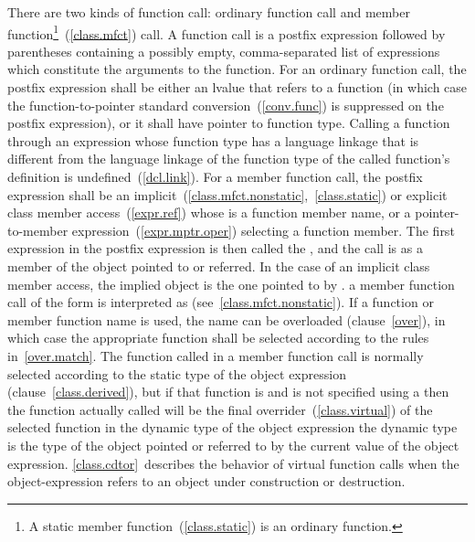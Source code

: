 \pnum
{}%
%
%
There are two kinds of function call: ordinary function call and member
function\footnote{A static member function~(\ref{class.static}) is an ordinary
function.}~(\ref{class.mfct}) call.
A function call is a postfix expression followed by parentheses
containing a possibly empty, comma-separated list of expressions which
constitute the arguments to the function. For an ordinary function call,
the postfix expression shall be either an lvalue that refers to a
function (in which case the function-to-pointer standard
conversion~(\ref{conv.func}) is suppressed on the postfix expression),
or it shall have pointer to function type. Calling a function through an
expression whose function type has a language linkage that is different
from the language linkage of the function type of the called function's
definition is undefined~(\ref{dcl.link}). For a member function call,
the postfix expression shall be an
implicit~(\ref{class.mfct.nonstatic},~\ref{class.static}) or explicit
class member access~(\ref{expr.ref}) whose  is a
function member name, or a pointer-to-member
expression~(\ref{expr.mptr.oper}) selecting a function member. The first
expression in the postfix expression is then called the
, and the call is as a member of
the object pointed to or referred. In the case of an implicit class
member access, the implied object is the one pointed to by .
\enternote 
a member function call of the form  is interpreted as
 (see~\ref{class.mfct.nonstatic}).
\exitnote 
If a function or member function name is used, the name can be
overloaded (clause~\ref{over}), in which case the appropriate function
shall be selected according to the rules in~\ref{over.match}. The
function called in a member function call is normally selected according
to the static type of the object expression (clause~\ref{class.derived}),
but if that function is  and is not specified using a
 then the function actually called will be the
final overrider~(\ref{class.virtual}) of the selected function in the
dynamic type of the object expression
\enternote 
the dynamic type is the type of the object pointed or referred to by the
current value of the object expression. \ref{class.cdtor}~describes the
behavior of virtual function calls when the object-expression
refers to an object under construction or destruction.
\exitnote 


